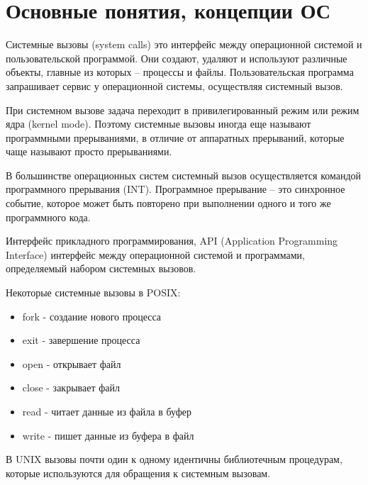 \documentclass{beamer}
\begin{document}
\section{Основные понятия, концепции ОС}
\begin{frame}[t]
\begin{block}{Системные вызовы (system calls)}
это интерфейс между операционной системой и пользовательской программой. Они создают, удаляют и используют различные объекты, главные из которых – процессы и файлы. Пользовательская программа запрашивает сервис у операционной системы, осуществляя системный вызов.  
\end{block}
При системном вызове задача переходит в привилегированный режим или режим ядра (kernel mode). Поэтому системные вызовы иногда еще называют программными прерываниями, в отличие от аппаратных прерываний, которые чаще называют просто прерываниями.

В большинстве операционных систем системный вызов осуществляется командой программного прерывания (INT). Программное прерывание – это синхронное событие, которое может быть повторено при выполнении одного и того же программного кода.
\end{frame}

\begin{frame}[t]
\begin{block}{Интерфейс прикладного программирования, API (Application Programming Interface)}
интерфейс между операционной системой и программами, определяемый набором системных вызовов.
\end{block}
Некоторые системные вызовы в POSIX:
\begin{itemize}
\item fork - создание нового процесса
\item exit - завершение процесса
\item open - открывает файл
\item close - закрывает файл
\item read - читает данные из файла в буфер
\item write - пишет данные из буфера в файл
\end{itemize}
В UNIX вызовы почти один к одному идентичны библиотечным процедурам, которые используются для обращения к системным вызовам.
\end{frame}
\end{document}
